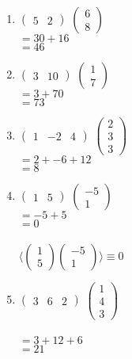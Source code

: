 \documentclass[a4paper]{article}
\begin{document}
	\begin{enumerate}[1.]
		\item $\begin{pmatrix}5 & 2\end{pmatrix}$
		$\begin{pmatrix}6 \\ 8\end{pmatrix}$\\
		$= 30 + 16$\\
		$= 46$

		\item $\begin{pmatrix}3 & 10\end{pmatrix}$
		$\begin{pmatrix}1 \\ 7\end{pmatrix}$\\
		$= 3 + 70$\\
		$= 73$

		\item $\begin{pmatrix}1 & -2 & 4\end{pmatrix}$
		$\begin{pmatrix}2 \\ 3 \\ 3\end{pmatrix}$\\
		$=2 + -6 + 12$\\
		$=8$

		\item $\begin{pmatrix}1 & 5\end{pmatrix}$
		$\begin{pmatrix}-5 \\ 1\end{pmatrix}$\\
		$=-5 + 5$\\
		$= 0$\\\\
		$\langle \begin{pmatrix}1 \\ 5\end{pmatrix}\begin{pmatrix}-5 \\ 1\end{pmatrix}\rangle \equiv 0$

		\item $\begin{pmatrix}3 & 6 & 2\end{pmatrix}$
		$\begin{pmatrix}1 \\ 4 \\ 3\end{pmatrix}$\\\\
		$= 3+ 12+ 6$\\
		$=21$


\end{enumerate}
\end{document}
